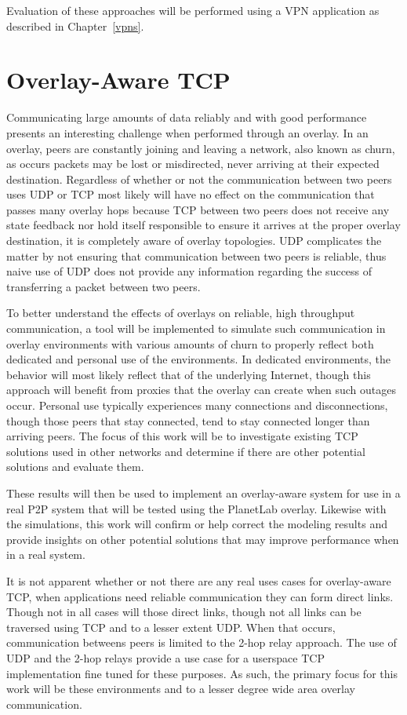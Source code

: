 Evaluation of these approaches will be performed using a VPN application as
described in Chapter~\ref{vpns}.

\section{Overlay-Aware TCP}
\label{tcp}
Communicating large amounts of data reliably and with good performance presents
an interesting challenge when performed through an overlay.  In an overlay,
peers are constantly joining and leaving a network, also known as churn, as
occurs packets may be lost or misdirected, never arriving at their expected
destination.  Regardless of whether or not the communication between two peers
uses UDP or TCP most likely will have no effect on the communication that passes
many overlay hops because TCP between two peers does not receive any state
feedback nor hold itself responsible to ensure it arrives at the proper overlay
destination, it is completely aware of overlay topologies.  UDP complicates the
matter by not ensuring that communication between two peers is reliable, thus
naive use of UDP does not provide any information regarding the success of
transferring a packet between two peers.

To better understand the effects of overlays on reliable, high throughput
communication, a tool will be implemented to simulate such communication in
overlay environments with various amounts of churn to properly reflect both
dedicated and personal use of the environments.  In dedicated environments, the
behavior will most likely reflect that of the underlying Internet, though this
approach will benefit from proxies that the overlay can create when such outages
occur.  Personal use typically experiences many connections and disconnections,
though those peers that stay connected, tend to stay connected longer than
arriving peers.  The focus of this work will be to investigate existing TCP
solutions used in other networks and determine if there are other potential
solutions and evaluate them.

These results will then be used to implement an overlay-aware system for use in
a real P2P system that will be tested using the PlanetLab overlay.  Likewise with
the simulations, this work will confirm or help correct the modeling results and
provide insights on other potential solutions that may improve performance when
in a real system.

It is not apparent whether or not there are any real uses cases for 
overlay-aware TCP, when applications need reliable communication they can form
direct links.  Though not in all cases will those direct links, though not
all links can be traversed using TCP and to a lesser extent UDP.  When that
occurs, communication betweens peers is limited to the 2-hop relay approach.
The use of UDP and the 2-hop relays provide a use case for a userspace TCP
implementation fine tuned for these purposes.  As such, the primary focus for
this work will be these environments and to a lesser degree wide area overlay
communication.

